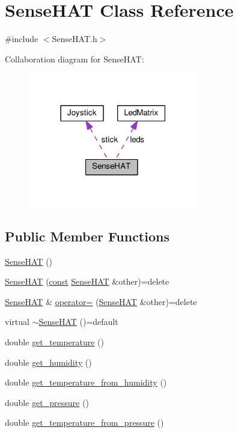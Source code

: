 \hypertarget{class_sense_h_a_t}{}\section{Sense\+H\+AT Class Reference}
\label{class_sense_h_a_t}


{\ttfamily \#include $<$Sense\+H\+A\+T.\+h$>$}



Collaboration diagram for Sense\+H\+AT\+:\nopagebreak
\begin{figure}[H]
\begin{center}
\leavevmode
\includegraphics[width=210pt]{class_sense_h_a_t__coll__graph}
\end{center}
\end{figure}
\subsection*{Public Member Functions}
\begin{DoxyCompactItemize}
\item 
\hyperlink{class_sense_h_a_t_a6f1b370e30d524ee6bccaa19c5566fbe}{Sense\+H\+AT} ()
\item 
\hyperlink{class_sense_h_a_t_a39f7095d97dd434479c05e85bdc32952}{Sense\+H\+AT} (\hyperlink{functions__c_8js_afacfd9c985d225bb07483b887a801b6f}{const} \hyperlink{class_sense_h_a_t}{Sense\+H\+AT} \&other)=delete
\item 
\hyperlink{class_sense_h_a_t}{Sense\+H\+AT} \& \hyperlink{class_sense_h_a_t_aa05efe7c4e0933067e3b655470dfd6df}{operator=} (\hyperlink{class_sense_h_a_t}{Sense\+H\+AT} \&other)=delete
\item 
virtual \hyperlink{class_sense_h_a_t_a1af79051ee9d294203278d8d3f22036a}{$\sim$\+Sense\+H\+AT} ()=default
\item 
double \hyperlink{class_sense_h_a_t_ae0d2f1c110a5dfe453bdb2f22cf719c0}{get\+\_\+temperature} ()
\item 
double \hyperlink{class_sense_h_a_t_a270dbefc2b736c1ef3dfc996f968611f}{get\+\_\+humidity} ()
\item 
double \hyperlink{class_sense_h_a_t_af1ffda111c9826f7eb3b88aa0ea29a00}{get\+\_\+temperature\+\_\+from\+\_\+humidity} ()
\item 
double \hyperlink{class_sense_h_a_t_a6fcb3739537d351a60375a8aa8309a4e}{get\+\_\+pressure} ()
\item 
double \hyperlink{class_sense_h_a_t_abe8f9a29726dbfeac2bd45cff6f8a984}{get\+\_\+temperature\+\_\+from\+\_\+pressure} ()
\end{DoxyCompactItemize}
